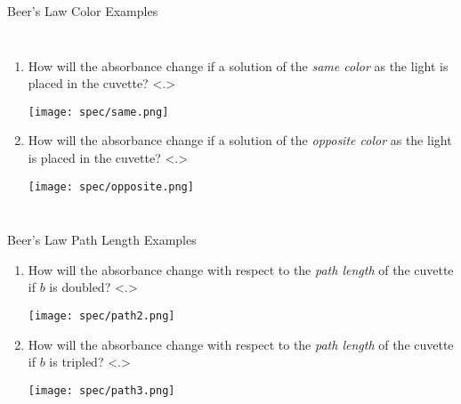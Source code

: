 \documentclass[notes=only]{beamer}
\begin{document}
\begin{frame}{Beer's Law Color Examples}
	\begin{columns}
		\begin{enumerate}[<+->]
			\item How will the absorbance change if a solution of the
				\emph{same color} as the light is placed in the
				cuvette?
				\note<.>{%
					\begin{center}
						\texttt{[image: spec/same.png]}
					\end{center}
				}
			\item How will the absorbance change if a solution of the
				\emph{opposite color} as the light is placed in the
				cuvette?
			\note<.>{%
				\begin{center}
					\texttt{[image: spec/opposite.png]}
				\end{center}
			}
		\end{enumerate}
		\onslide<+->
	\end{columns}
\end{frame}

\begin{frame}[t]{Beer's Law Path Length Examples}
	\begin{enumerate}
		\item How will the absorbance change with respect to the
			\emph{path length} of the cuvette if $b$ is doubled?
			\note<.>{%
				\begin{center}
					\texttt{[image: spec/path2.png]}
				\end{center}
			}
		\item How will the absorbance change with respect to the
			\emph{path length} of the cuvette if $b$ is tripled?
			\note<.>{%
				\begin{center}
					\texttt{[image: spec/path3.png]}
				\end{center}
			}
	\end{enumerate}
\end{frame}
\end{document}
